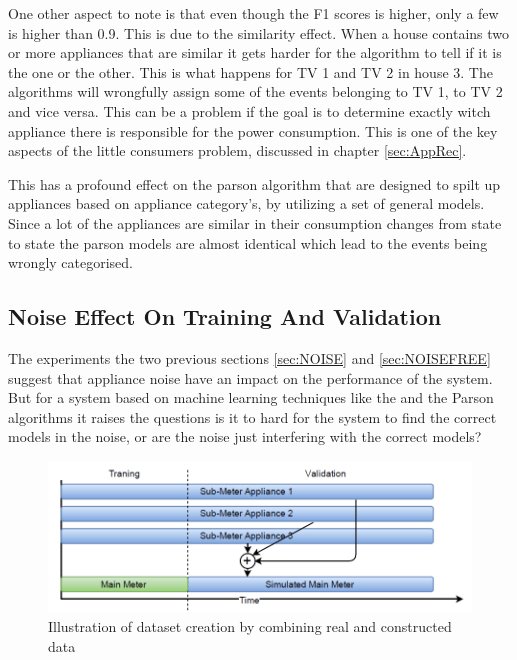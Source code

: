 One other aspect to note is that even though the F1 scores is higher, only a few is higher than 0.9. This is due to the similarity effect. When a house contains two or more appliances that are similar it gets harder for the algorithm to tell if it is the one or the other. This is what happens for TV 1 and TV 2 in house 3. The algorithms will wrongfully assign some of the events belonging to TV 1, to TV 2 and vice versa. This can be a problem if the goal is to determine exactly witch appliance there is responsible for the power consumption. This is one of the key aspects of the little consumers problem, discussed in chapter \ref{sec:AppRec}.

This has a profound effect on the parson algorithm that are designed to spilt up appliances based on appliance category's, by utilizing a set of general models. Since a lot of the appliances are similar in their consumption changes from state to state the parson models are almost identical which lead to the events being wrongly categorised. 

\newpage

\subsection{Noise Effect On Training And Validation }
The experiments the two previous sections \ref{sec:NOISE} and \ref{sec:NOISEFREE} suggest that appliance noise have an impact on the performance of the system. But for a system based on machine learning techniques like the  and the Parson algorithms it raises the questions is it to hard for the system to find the correct models in the noise, or are the noise just interfering with the correct models? 

\begin{figure}[H]
\centering
\includegraphics[width=1\textwidth]{billeder/REALSIM.png}
\caption{Illustration of dataset creation by combining real and constructed data}
\label{fig:REALSIMILU}
\end{figure}

